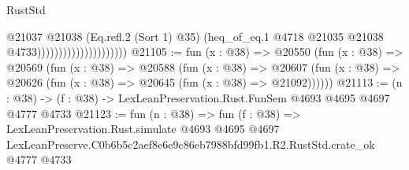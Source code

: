 \begin{lexlean}{RustStd}
\begin{coremodule}
                                          @21037
                                            @21038
                                            (Eq.refl.{2} (Sort 1) @35)
                                            (heq_of_eq.{1}
                                              @4718
                                              @21035
                                              @21038
                                              @4733)))))))))))))))))))))
@21105 := fun (x : @38) =>
  @20550
    (fun (x : @38) =>
    @20569
      (fun (x : @38) =>
      @20588
        (fun (x : @38) =>
        @20607 (fun (x : @38) => @20626 (fun (x : @38) => @20645 (fun (x : @38) => @21092))))))
@21113 := (n : @38) -> (f : @38) -> LexLeanPreservation.Rust.FunSem @4693 @4695 @4697 @4777 @4733
@21123 := fun (n : @38) =>
  fun (f : @38) =>
  LexLeanPreservation.Rust.simulate
    @4693
    @4695
    @4697
    LexLeanPreserve.C0b6b5c2aef8e6e9c86eb7988bfd99fb1.R2.RustStd.crate_ok
    @4777
    @4733
\end{coremodule}
\end{lexlean}
